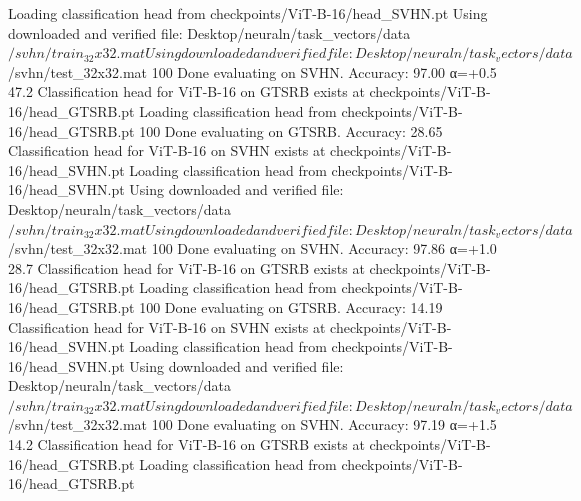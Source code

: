 Loading classification head from checkpoints/ViT-B-16/head_SVHN.pt
Using downloaded and verified file: Desktop/neuraln/task_vectors/data$/svhn/train_32x32.mat
Using downloaded and verified file: Desktop/neuraln/task_vectors/data$/svhn/test_32x32.mat
100%
Done evaluating on SVHN. Accuracy: 97.00%
  α=+0.5        47.2%
Classification head for ViT-B-16 on GTSRB exists at checkpoints/ViT-B-16/head_GTSRB.pt
Loading classification head from checkpoints/ViT-B-16/head_GTSRB.pt
100%
Done evaluating on GTSRB. Accuracy: 28.65%
Classification head for ViT-B-16 on SVHN exists at checkpoints/ViT-B-16/head_SVHN.pt
Loading classification head from checkpoints/ViT-B-16/head_SVHN.pt
Using downloaded and verified file: Desktop/neuraln/task_vectors/data$/svhn/train_32x32.mat
Using downloaded and verified file: Desktop/neuraln/task_vectors/data$/svhn/test_32x32.mat
100%
Done evaluating on SVHN. Accuracy: 97.86%
  α=+1.0        28.7%
Classification head for ViT-B-16 on GTSRB exists at checkpoints/ViT-B-16/head_GTSRB.pt
Loading classification head from checkpoints/ViT-B-16/head_GTSRB.pt
100%
Done evaluating on GTSRB. Accuracy: 14.19%
Classification head for ViT-B-16 on SVHN exists at checkpoints/ViT-B-16/head_SVHN.pt
Loading classification head from checkpoints/ViT-B-16/head_SVHN.pt
Using downloaded and verified file: Desktop/neuraln/task_vectors/data$/svhn/train_32x32.mat
Using downloaded and verified file: Desktop/neuraln/task_vectors/data$/svhn/test_32x32.mat
100%
Done evaluating on SVHN. Accuracy: 97.19%
  α=+1.5        14.2%
Classification head for ViT-B-16 on GTSRB exists at checkpoints/ViT-B-16/head_GTSRB.pt
Loading classification head from checkpoints/ViT-B-16/head_GTSRB.pt
